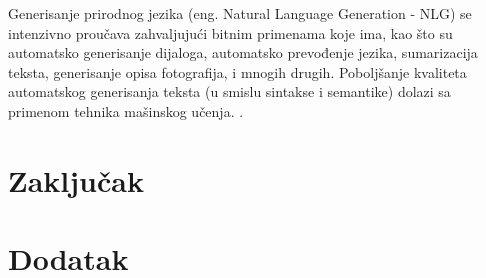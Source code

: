 \documentclass[a4paper]{article}
\begin{document}
Generisanje prirodnog jezika (eng. Natural Language Generation - NLG) se intenzivno proučava zahvaljujući bitnim primenama koje ima, kao što su automatsko generisanje dijaloga, automatsko prevođenje jezika, sumarizacija teksta, generisanje opisa fotografija, i mnogih drugih. Poboljšanje kvaliteta automatskog generisanja teksta (u smislu sintakse i semantike) dolazi sa primenom tehnika mašinskog učenja. \cite{wang2018automatic}. 


\section{Zaključak}
\label{sec:zakljucak}




\appendix
 


\appendix
\section{Dodatak}
\end{document}
